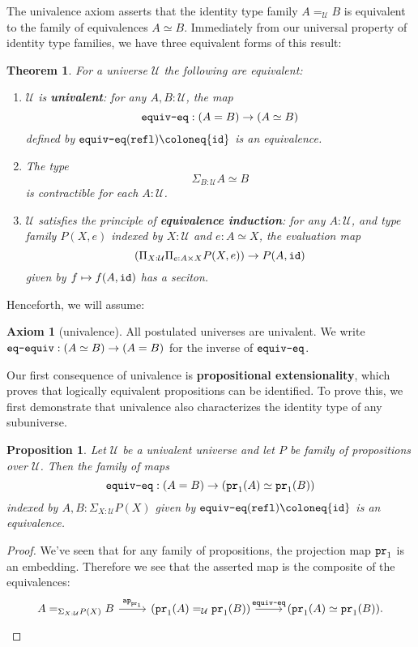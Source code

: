 \documentclass{amsart}
\theoremstyle{theorem}
\newtheorem*{thm}{Theorem}
\newtheorem*{prop}{Proposition}
\theoremstyle{definition}
\newtheorem*{ax}{Axiom}
\theoremstyle{remark}
\newcommand{\0}{\mathbbe{0}}
\newcommand{\1}{\mathbbe{1}}
\newcommand{\2}{\mathbbe{2}}
\newcommand{\3}{\mathbbe{3}}
\newcommand{\4}{\mathbbe{4}}
\newcommand{\term}[1]{{\textup{\texttt{#1}}}}
\newcommand{\id}{\term{id}}
\newcommand{\pr}{\term{pr}}
\newcommand{\refl}{\term{refl}}
\newcommand{\ap}{\term{ap}}
\newcommand{\UU}{{\mathcal{U}}}
\begin{document}
The univalence axiom asserts that the identity type family $A =_\UU B$ is equivalent to the family of equivalences $A \simeq B$. Immediately from our universal property of identity type families, we have three equivalent forms of this result:

\begin{thm} For a universe $\UU$ the following are equivalent:
\begin{enumerate}
\item $\UU$ is \textbf{univalent}: for any $A, B : \UU$, the map
\[ \term{equiv-eq} : (A = B) \to (A \simeq B)\]
defined by $\term{equiv-eq}(\refl) \coloneq \id$ is an equivalence.
\item The type
\[ \Sigma_{B: \UU}A \simeq B\]
is contractible for each $A : \UU$.
\item $\UU$ satisfies the principle of \textbf{equivalence induction}: for any $A : \UU$, and type family $P(X,e)$ indexed by $X : \UU$ and $e : A \simeq X$, the evaluation map
\[ \left( \Pi_{X: \UU} \Pi_{e: A \times X} P(X,e) \right) \to P(A,\id)\]
given by $f \mapsto f(A,\id)$ has a seciton.
\end{enumerate}
\end{thm}

Henceforth, we will assume:
\begin{ax}[univalence]
All postulated universes are univalent. We write $\term{eq-equiv} : (A \simeq B) \to (A=B)$ for the inverse of $\term{equiv-eq}$.
\end{ax}

Our first consequence of univalence is \textbf{propositional extensionality}, which proves that logically equivalent propositions can be identified. To prove this, we first demonstrate that univalence also characterizes the identity type of any subuniverse.

\begin{prop} Let $\UU$ be a univalent universe and let $P$ be family of propositions over $\UU$. Then the family of maps
\[ \term{equiv-eq} : (A =B ) \to (\pr_1(A) \simeq \pr_1(B))\]
indexed by $A,B : \Sigma_{X:\UU} P(X)$ given by $\term{equiv-eq}(\refl) \coloneq \id$ is an equivalence.
\end{prop}
\begin{proof}
We've seen that for any family of propositions, the projection map $\pr_1$ is an embedding. Therefore we see that the asserted map is the composite of the equivalences:
\[
\begin{tikzcd} A =_{\Sigma_{X:\UU} P(X)} B \arrow[r, "\ap_{\pr_1}"] & (\pr_1(A) =_\UU \pr_1(B)) \arrow[r, "\term{equiv-eq}"] & (\pr_1(A) \simeq \pr_1(B)).
\end{tikzcd}\qedhere
\]
\end{proof}
\end{document}
